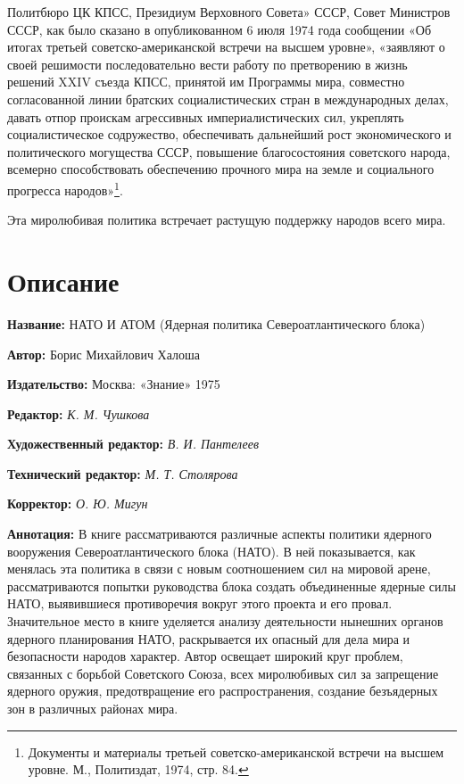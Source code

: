 \documentclass[12pt, a4paper, openany]{book}
\begin{document}
	Политбюро ЦК КПСС, Президиум Верховного Совета» СССР, Совет Министров СССР, как было сказано в опубликованном 6 июля 1974 года сообщении «Об итогах третьей советско-американской встречи на высшем уровне», «заявляют о своей решимости последовательно вести работу по претворению в жизнь решений XXIV съезда КПСС, принятой им Программы мира, совместно согласованной линии братских социалистических стран в международных делах, давать отпор проискам агрессивных империалистических сил, укреплять социалистическое содружество, обеспечивать дальнейший рост экономического и политического могущества СССР, повышение благосостояния советского народа, всемерно способствовать обеспечению прочного мира на земле и социального прогресса народов»{\footnote{Документы и материалы третьей советско-американской встречи на высшем уровне. М., Политиздат, 1974, стр. 84.}}. 
	
	Эта миролюбивая политика встречает растущую поддержку народов всего мира.
	
	
	\newpage
	\tableofcontents
	
	\thispagestyle{empty} %
	
	\newpage
	
	\setcounter{secnumdepth}{0}
	
	
		\section*{Описание}
	
	{\bf Название:} НАТО И АТОМ (Ядерная политика Североатлантического блока) 
	
{\bf Автор:} Борис Михайлович Халоша
	
{\bf Издательство:} Москва: «Знание» 1975
	
		{\bf Редактор:} \textit{К. М. Чушкова}
	
		{\bf Художественный редактор:} \textit{В. И. Пантелеев}
	
		{\bf Технический редактор:} \textit{М. Т. Столярова}
	
		{\bf Корректор:} \textit{О. Ю. Мигун}
	
		{\bf Аннотация:} В книге рассматриваются различные аспекты политики ядерного вооружения Североатлантического блока (НАТО). В ней показывается, как менялась эта политика в связи с новым соотношением сил на мировой арене, рассматриваются попытки руководства блока создать объединенные ядерные силы НАТО, выявившиеся противоречия вокруг этого проекта и его провал. Значительное место в книге уделяется анализу деятельности нынешних органов ядерного планирования НАТО, раскрывается их опасный для дела мира и безопасности народов характер. Автор освещает широкий круг проблем, связанных с борьбой Советского Союза, всех миролюбивых сил за запрещение ядерного оружия, предотвращение его распространения, создание безъядерных зон в различных районах мира. 
		\thispagestyle{empty} %

	
\end{document}
